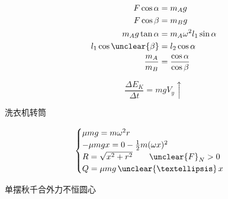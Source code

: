 \begin{problem}
\begin{solution}
\begin{align*}
F\cos\alpha&=m_Ag\\
F\cos\beta&=m_Bg\\
m_Ag\tan\alpha&=m_A\omega^2l_1\sin\alpha\\
l_1\cos\unclear{\beta}&=l_2\cos\alpha\\ %
\frac{m_A}{m_B}&=\frac{\cos\alpha}{\cos\beta}
\end{align*}
\end{solution}
\end{problem}
\begin{problem}
\begin{solution}
\[ \frac{\Delta E_K}{\Delta t}=mgV_y\uparrow \]
\end{solution}
\end{problem}
\begin{problem}
洗衣机转筒
\begin{solution}
\[ \begin{cases}
\mu mg=m\omega^2r\\
-\mu mgx=0-\frac12m(\omega x)^2 \\ %
R=\sqrt{x^2+r^2}\qquad \unclear{F}_N>0 \\ %
Q=\mu mg\,\unclear{…}\,x %
\end{cases} \]
\end{solution}
\end{problem}
单摆秋千合外力不恒圆心
